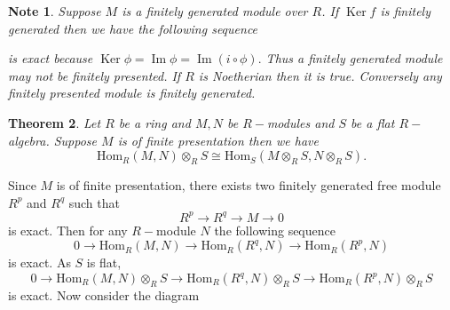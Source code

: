 \documentclass[11pt]{amsart}
\newtheorem{theorem}{Theorem}[section]
\newtheorem{note}[theorem]{Note}
\newcommand{\Hom}[1]{\text{Hom}_R\left(#1\right)}
\newcommand{\Homs}[1]{\text{Hom}_S\left(#1\right)}
\DeclareMathOperator{\im}{\text{Im}}
\DeclareMathOperator{\Ker}{\text{Ker}}
\begin{document}
\begin{note}
Suppose $M$ is a finitely generated module over $R$. If $\Ker f$ is finitely generated then we have the following sequence

\begin{center}
\end{center}

 is exact because $\Ker \phi=\im\phi=\im (i\circ \phi).$ Thus a finitely generated module may not be finitely presented. If $R$ is Noetherian then it is true. Conversely any finitely presented module is finitely generated.

\end{note}

\begin{theorem}

Let $R$ be a ring and $M, N$ be $R-$modules and $S$ be a flat $R-$algebra. Suppose $M$ is of finite presentation then we have $$\Hom{M,N}\otimes_R S\cong \Homs{M\otimes_R S, N\otimes_R S}.$$

\end{theorem}

\proof Since $M$ is of finite presentation, there exists two finitely generated free module $R^p$ and $R^q$ such that \begin{equation}
R^p\to R^q\to M\to 0 
\end{equation}
is exact. Then for any $R-$module $N$ the following sequence \begin{equation}
0\to \Hom{M,N}\to \Hom{R^q,N}\to \Hom{R^p,N}
\end{equation}
is exact. As $S$ is flat, $$0\to \Hom{M,N}\otimes_R S\to \Hom{R^q,N}\otimes_R S\to \Hom{R^p,N}\otimes_R S$$ is exact. Now consider the diagram 

\begin{center}


\end{center}
\end{document}

